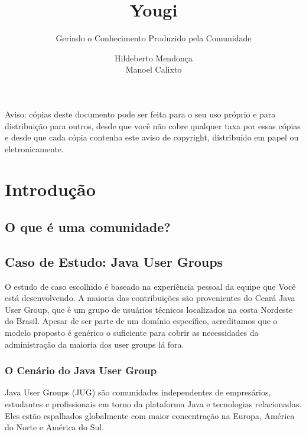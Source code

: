 \documentclass[envcountsame,envcountchap]{svmono}
\author{Hildeberto Mendonça \\ Manoel Calixto}
\title{Yougi}
\subtitle{Gerindo o Conhecimento Produzido pela Comunidade}
\begin{document}
\maketitle

\frontmatter

\thispagestyle{empty}
\vspace*{3.5cm}
\begin{flushleft}
Aviso: cópias deste documento pode ser feita para o seu uso próprio e para distribuição para outros, desde que você não cobre qualquer taxa por essas cópias e desde que cada cópia contenha este aviso de copyright, distribuído em papel ou eletronicamente.
\end{flushleft}

\tableofcontents

\listoffigures

\listoftables

\mainmatter

\chapter{Introdução}

\section{O que é uma comunidade?}

\section{Caso de Estudo: Java User Groups}

O estudo de caso escolhido é baseado na experiência pessoal da equipe que Você está desenvolvendo. A maioria das contribuições são provenientes do Cear\'{a} Java User Group, que é um grupo de usuários técnicos localizados na costa Nordeste do Brasil. Apesar de ser parte de um domínio específico, acreditamos que o modelo proposto é genérico o suficiente para cobrir as necessidades da administração da maioria dos user groups lá fora.

\subsection{O Cenário do Java User Group}

Java User Groups (JUG) são comunidades independentes de empresários, estudantes e profissionais em torno da plataforma Java e tecnologias relacionadas. Eles estão espalhados globalmente com maior concentração na Europa, América do Norte e América do Sul.
\end{document}
